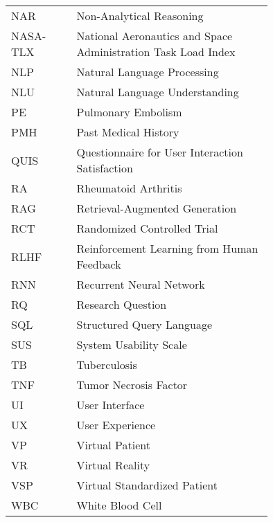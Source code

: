 \begin{flushleft}
\begin{tabular}{l p{0.75\linewidth}}
NAR       & Non-Analytical Reasoning \\
NASA-TLX  & National Aeronautics and Space Administration Task Load Index \\
NLP       & Natural Language Processing \\
NLU       & Natural Language Understanding \\
PE        & Pulmonary Embolism \\
PMH       & Past Medical History \\
QUIS      & Questionnaire for User Interaction Satisfaction \\
RA        & Rheumatoid Arthritis \\
RAG       & Retrieval-Augmented Generation \\
RCT       & Randomized Controlled Trial \\
RLHF      & Reinforcement Learning from Human Feedback \\
RNN       & Recurrent Neural Network \\
RQ        & Research Question \\
SQL       & Structured Query Language \\
SUS       & System Usability Scale \\
TB        & Tuberculosis \\
TNF       & Tumor Necrosis Factor \\
UI        & User Interface \\
UX        & User Experience \\
VP        & Virtual Patient \\
VR        & Virtual Reality \\
VSP       & Virtual Standardized Patient \\
WBC       & White Blood Cell \\
\end{tabular}
\end{flushleft}